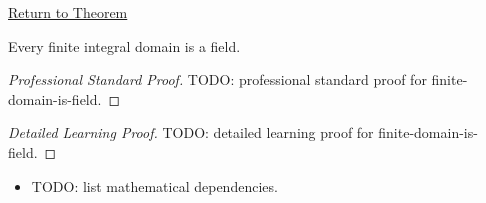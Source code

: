 \newpage
{}
\label{prf:finite-domain-is-field}

\begin{remark*}[Return]
\hyperref[prop:finite-domain-is-field]{Return to Theorem}
\end{remark*}

\begin{proposition*}
Every finite integral domain is a field.
\end{proposition*}

\begin{proof}[Professional Standard Proof]
\LRAProofBodyStart
TODO: professional standard proof for finite-domain-is-field.
\end{proof}

\begin{proof}[Detailed Learning Proof]
\LRAProofBodyStart
TODO: detailed learning proof for finite-domain-is-field.
\end{proof}

\begin{remark*}
\end{remark*}

\begin{dependencies}
\begin{itemize}
  \item TODO: list mathematical dependencies.
\end{itemize}
\end{dependencies}

\clearpage
